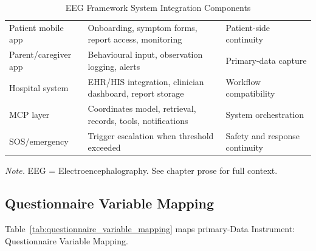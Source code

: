{\tablestripes\tablefontsize

\begin{xltabular}{\textwidth}{@{} >{\raggedright\arraybackslash}p{2.8cm} L L @{}}
\caption[EEG Framework System Integration Components]{EEG Framework System Integration Components}\label{tab:eeg_system_integration} \\
\toprule
{} &  &  \\
\midrule
\endfirsthead
\endhead
\bottomrule
\endlastfoot
Patient mobile app & Onboarding, symptom forms, report access, monitoring & Patient-side continuity \\
Parent/caregiver app & Behavioural input, observation logging, alerts & Primary-data capture \\
Hospital system & EHR/HIS integration, clinician dashboard, report storage & Workflow compatibility \\
MCP layer & Coordinates model, retrieval, records, tools, notifications & System orchestration \\
SOS/emergency & Trigger escalation when threshold exceeded & Safety and response continuity \\
\end{xltabular}}
\vspace{0.3em}\noindent\textit{Note.} EEG = Electroencephalography. See chapter prose for full context.

\subsection{Questionnaire Variable Mapping}\label{sec:appendix_ch3_questionnaire_variable_mapping}

\noindent Table~\ref{tab:questionnaire_variable_mapping} maps primary-Data Instrument: Questionnaire Variable Mapping.


